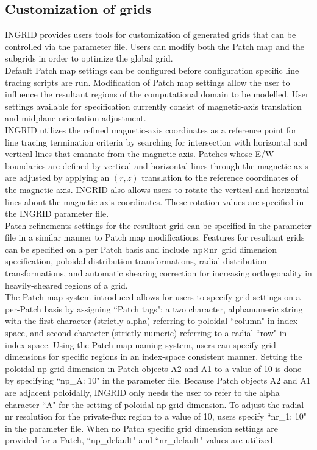 \subsection{Customization of grids}
INGRID provides users tools for customization of generated grids that can be controlled via the parameter file. Users can modify both the Patch map and the subgrids in order to optimize the global grid.\\ \indent
Default Patch map settings can be configured before configuration specific line tracing scripts are run. Modification of Patch map settings allow the user to influence the resultant regions of the computational domain to be modelled. User settings available for specification currently consist of magnetic-axis translation and midplane orientation adjustment.\\ \indent
INGRID utilizes the refined magnetic-axis coordinates as a reference point for line tracing termination criteria by searching for intersection with horizontal and vertical lines that emanate from the magnetic-axis. Patches whose E/W boundaries are defined by vertical and horizontal lines through the magnetic-axis are adjusted by applying an $(r,z)$ translation to the reference coordinates of the magnetic-axis. INGRID also allows users to rotate the vertical and horizontal lines about the magnetic-axis coordinates. These rotation values are specified in the INGRID parameter file.\\ \indent
Patch refinements settings for the resultant grid can be specified in the parameter file in a similar manner to Patch map modifications. Features for resultant grids can be specified on a per Patch basis and include $\text{np}\times\text{nr}$ grid dimension specification, poloidal distribution transformations, radial distribution transformations, and automatic shearing correction for increasing orthogonality in heavily-sheared regions of a grid.\\ \indent
The Patch map system introduced allows for users to specify grid settings on a per-Patch basis by assigning ``Patch tags": a two character, alphanumeric string with the first character (strictly-alpha) referring to poloidal ``column" in index-space, and second character (strictly-numeric) referring to a radial ``row" in index-space. Using the Patch map naming system, users can specify grid dimensions for specific regions in an index-space consistent manner. Setting the poloidal np grid dimension in Patch objects A2 and A1 to a value of 10 is done by specifying ``np\_A: 10" in the parameter file. Because Patch objects A2 and A1 are adjacent poloidally, INGRID only needs the user to refer to the alpha character ``A" for the setting of poloidal np grid dimension. To adjust the radial nr resolution for the private-flux region to a value of 10, users specify ``nr\_1: 10" in the parameter file. When no Patch specific grid dimension settings are provided for a Patch, ``np\_default" and ``nr\_default" values are utilized.\\ \indent

